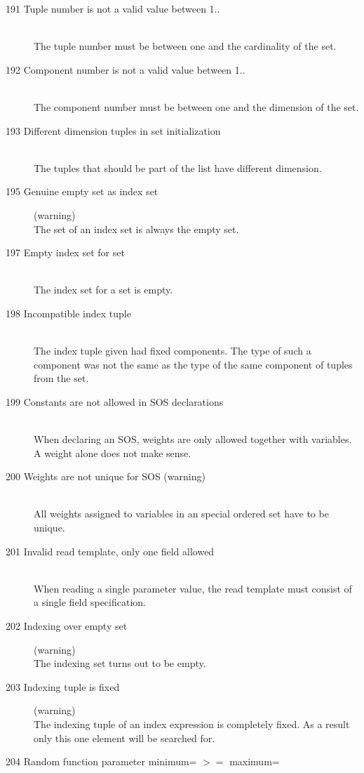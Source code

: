 \begin{description}
\item[191 Tuple number  is not a valid value between 1..]\ \\
  The tuple number must be between one and the cardinality of the set.
\item[192 Component number  is not a valid value between 1..]\ \\
  The component number must be between one and the dimension of the set.
\item[193 Different dimension tuples in set initialization]\ \\
  The tuples that should be part of the list have different dimension.
\item[195 Genuine empty set as index set] (warning)\ \\
  The set of an index set is always the empty set.
\item[197 Empty index set for set]\ \\
  The index set for a set is empty.
\item[198 Incompatible index tuple]\ \\
  The index tuple given had fixed components. The type of such a
  component was not the same as the type of the same component of tuples
  from the set.
\item[199 Constants are not allowed in SOS declarations]\ \\
  When declaring an SOS, weights are only allowed together with
  variables. A weight alone does not make sense.
\item[200 Weights are not unique for SOS  (warning)]\ \\
  All weights assigned to variables in an special ordered set have to
  be unique. 
\item[201 Invalid read template, only one field allowed]\ \\
  When reading a single parameter value, the read template must
  consist of a single field specification.
\item[202 Indexing over empty set] (warning)\ \\
  The indexing set turns out to be empty.
\item[203 Indexing tuple is fixed] (warning)\ \\
  The indexing tuple of an index expression is completely fixed. As a
  result only this one element will be searched for.
\item[204 Random function parameter minimum=  $>=$ maximum=
  ]\ \\

\end{description}
